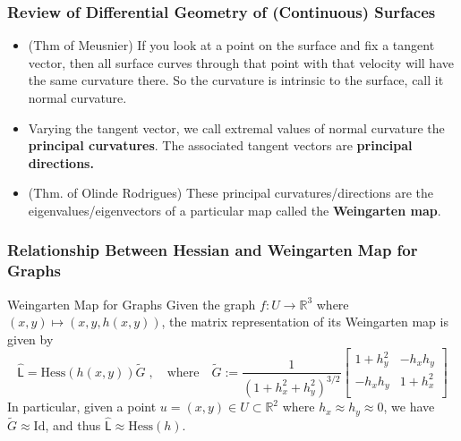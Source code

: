 \documentclass[9pt,notes]{beamer}
\begin{document}
\begin{frame}
\frametitle{Review of Differential Geometry of (Continuous) Surfaces}
  \begin{itemize}
    \item (Thm of Meusnier)
          If you look at a point on the surface and fix a tangent vector,
          then all surface curves through that point with that velocity
          will have the same curvature there.
          So the curvature is intrinsic to the surface, call it normal curvature.
    \item Varying the tangent vector,
          we call extremal values of normal curvature the
          \textbf{principal curvatures}.
          The associated tangent vectors are \textbf{principal directions.}
    \item (Thm. of Olinde Rodrigues)
          These principal curvatures/directions are
          the eigenvalues/eigenvectors of
          a particular map called the \textbf{Weingarten map}.
  \end{itemize}
\end{frame}

\begin{frame}
\frametitle{Relationship Between Hessian and Weingarten Map for Graphs}
    \begin{block}{Weingarten Map for Graphs}
    Given the graph $f: U \to \mathbb{R}^3$ where $(x,y) \mapsto (x, y, h(x,y))$, the matrix
    representation of its Weingarten map is given by
    \begin{equation}
    \widehat{\mathsf{L}} = \mathrm{Hess}(h(x,y)) \tilde{G} \;,\quad \mathrm{where} \quad
    \tilde{G} := \frac{1}{\left({1+h_x^2 + h_y^2}\right)^{3/2}}
    \begin{bmatrix}
    1 + h_y^2 & -h_x h_y \\
    -h_x h_y & 1 + h_x^2 \\
    \end{bmatrix} 
    \end{equation}
    In particular, given a point $u = (x,y) \in U \subset \mathbb{R}^2$
    where $h_x \approx h_y \approx 0$, we
    have $\tilde{G} \approx \mathrm{Id}$, and thus
    $\widehat{\mathsf{L}} \approx \mathrm{Hess}(h)$.
  \end{block}
\end{frame}
\end{document}
